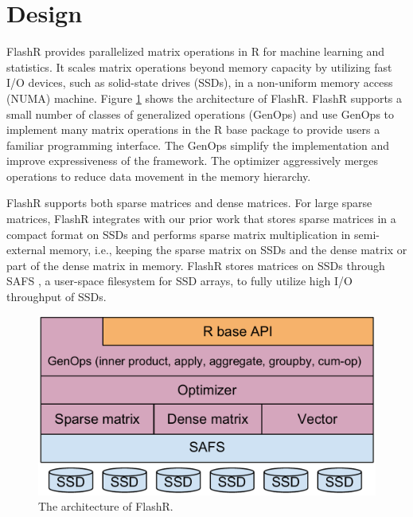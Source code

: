 \section{Design}

FlashR provides parallelized matrix operations in R for machine learning and
statistics. It scales matrix operations beyond memory capacity by utilizing
fast I/O devices, such as solid-state drives (SSDs), in a non-uniform memory
access (NUMA) machine. Figure \ref{fig:arch} shows the architecture of FlashR.
FlashR supports a small number of classes of generalized operations (GenOps)
and use GenOps to implement many matrix operations in the R base package
to provide users a familiar programming interface. The GenOps simplify
the implementation and improve expressiveness of the framework. The optimizer
aggressively merges operations to reduce data movement in the memory hierarchy.

FlashR supports both sparse matrices and dense matrices. For large sparse matrices,
FlashR integrates with our prior work \cite{SEM_SpMM} that stores sparse matrices
in a compact format on SSDs and performs sparse matrix multiplication
in semi-external memory, i.e., keeping the sparse matrix on SSDs and
the dense matrix or part of the dense matrix in memory. FlashR stores matrices
on SSDs through SAFS \cite{safs}, a user-space filesystem for SSD arrays,
to fully utilize high I/O throughput of SSDs.


\begin{figure}
\centering
\includegraphics[scale=0.3]{FlashMatrix_figs/architecture.pdf}
\vspace{-5pt}
\caption{The architecture of FlashR.}
\label{fig:arch}
\vspace{-10pt}
\end{figure}

